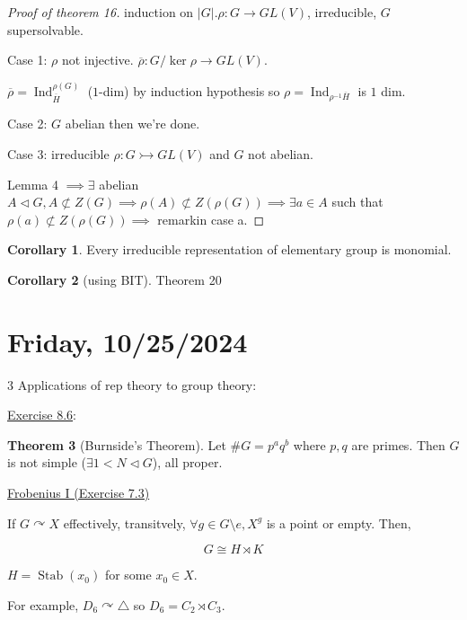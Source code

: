 \documentclass{article}
\theoremstyle{definition}
\newtheorem{theorem}{Theorem}
\newtheorem{corollary}[theorem]{Corollary}
\newcommand{\acts}{\curvearrowright}
\begin{document}
\begin{proof}
    [Proof of theorem 16] induction on \(\vert G \vert. \rho : G \to GL(V)\), irreducible, \(G\) supersolvable.

    Case 1: \(\rho \) not injective. \(\overline{\rho}: G / \ker \rho \to GL(V)\).

    \(\overline{\rho} = \operatorname{Ind}_{\overline{H}}^{\rho(G)}\) (\(1\)-dim) by induction hypothesis so \(\rho = \operatorname{Ind}_{\rho ^{-1} \overline{H}}\) is \(1\) dim.
    
    Case 2: \(G\) abelian then we're done.

    Case 3: irreducible \(\rho : G \rightarrowtail GL(V)\) and \(G\) not abelian.

    Lemma 4 \(\implies \exists\) abelian \(A \triangleleft G, A \not\subset Z(G) \implies \rho(A) \not\subset Z(\rho(G)) \implies \exists a\in A\) such that \(\rho(a)\not \subset Z(\rho(G)) \implies\) remarkin case a.
\end{proof}

\begin{corollary}
    Every irreducible representation of elementary group is monomial.
\end{corollary}

\begin{corollary}
    [using BIT] Theorem 20
\end{corollary}

\section*{Friday, 10/25/2024}

3 Applications of rep theory to group theory:

\underline{Exercise 8.6}:

\begin{theorem}
    [Burnside's Theorem] Let \(\#G = p^a q^b\) where \(p,q\) are primes. Then \(G\) is not simple (\(\exists 1 < N \triangleleft G\)), all proper.
\end{theorem}

\underline{Frobenius I (Exercise 7.3)} 

If \(G \acts X\) effectively, transitvely, \(\forall g\in G \setminus e, X^g\) is a point or empty. Then,

\[
    G \cong H \rtimes K
\]

\(H = \operatorname{Stab}(x_0)\) for some \(x_0\in X\). 


For example, \(D_6 \acts \triangle\) so \(D_6 = C_2 \rtimes C_3\).
\end{document}
